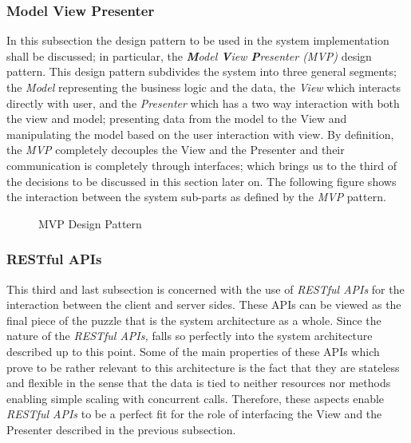 \subsubsection{Model View Presenter}
In this subsection the design pattern to be used in the system implementation shall be discussed; in particular, the \emph{\textbf{M}odel \textbf{V}iew \textbf{P}resenter (MVP)} design pattern. This design pattern subdivides the system into three general segments; the \emph{Model} representing the business logic and the data, the \emph{View} which interacts directly with user, and the \emph{Presenter} which has a two way interaction with both the view and model; presenting data from the model to the View and manipulating the model based on the user interaction with view. By definition, the \emph{MVP} completely decouples the View and the Presenter and their communication is completely through interfaces; which brings us to the third of the decisions to be discussed in this section later on. The following figure shows the interaction between the system sub-parts as defined by the \emph{MVP} pattern.

\begin{figure}[H]
\caption{MVP Design Pattern}
\label{fig:MVP-desgn-patt}
\centering

\end{figure}

\subsubsection{RESTful APIs}
This third and last subsection is concerned with the use of \emph{RESTful APIs} for the interaction between the client and server sides. These APIs can be viewed as the final piece of the puzzle that is the system architecture as a whole. Since the nature of the \emph{RESTful APIs,} falls so perfectly into the system architecture described up to this point. Some of the main properties of these APIs which prove to be rather relevant to this architecture is the fact that they are stateless and flexible in the sense that the data is tied to neither resources nor methods enabling simple scaling with concurrent calls. Therefore, these aspects enable \emph{RESTful APIs} to be a perfect fit for the role of interfacing the View and the Presenter described in the previous subsection. 
